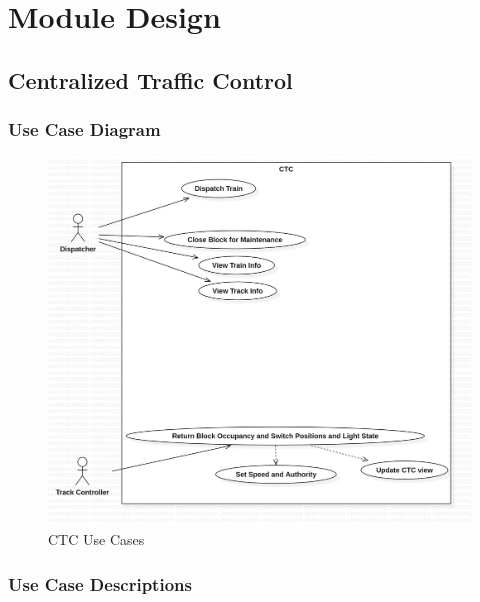 \documentclass{article}
\begin{document}
\section{Module Design}

    \subsection{Centralized Traffic Control}
    
    \subsubsection{Use Case Diagram}
     \begin{figure}[H]
        \centering
        \includegraphics[width=\textwidth]{./CTC/CTC_UseCaseDiagram.png}
        \caption{CTC Use Cases}
        \label{fig: CTC Use Cases}
    \end{figure}
    \subsubsection{Use Case Descriptions}
\end{document}

